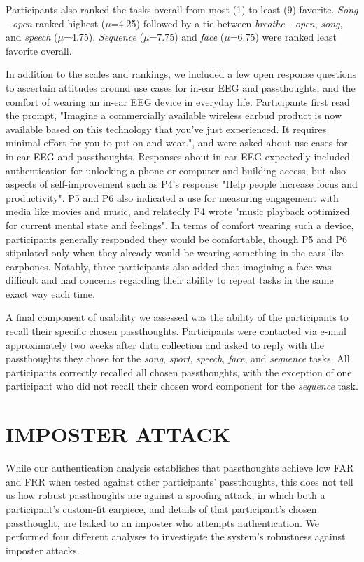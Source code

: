 \documentclass[a4paper,twoside]{article}
\begin{document}
Participants also ranked the tasks overall from most (1) to least (9) favorite. \textit{Song - open} ranked highest (\(\mu\)=4.25) followed by a tie between \textit{breathe - open}, \textit{song}, and \textit{speech} (\(\mu\)=4.75). \textit{Sequence} (\(\mu\)=7.75) and \textit{face} (\(\mu\)=6.75) were ranked least favorite overall.

In addition to the scales and rankings, we included a few open response questions to ascertain attitudes around use cases for in-ear EEG and passthoughts, and the comfort of wearing an in-ear EEG device in everyday life. Participants first read the prompt, "Imagine a commercially available wireless earbud product is now available based on this technology that you've just experienced. It requires minimal effort for you to put on and wear.", and were asked about use cases for in-ear EEG and passthoughts. Responses about in-ear EEG expectedly included authentication for unlocking a phone or computer and building access, but also aspects of self-improvement such as P4's response "Help people increase focus and productivity". P5 and P6 also indicated a use for measuring engagement with media like movies and music, and relatedly P4 wrote "music playback optimized for current mental state and feelings". In terms of comfort wearing such a device, participants generally responded they would be comfortable, though P5 and P6 stipulated only when they already would be wearing something in the ears like earphones. Notably, three participants also added that imagining a face was difficult and had concerns regarding their ability to repeat tasks in the same exact way each time.

A final component of usability we assessed was the ability of the participants to recall their specific chosen passthoughts. Participants were contacted via e-mail approximately two weeks after data collection and asked to reply with the passthoughts they chose for the \textit{song}, \textit{sport}, \textit{speech}, \textit{face}, and \textit{sequence} tasks. All participants correctly recalled all chosen passthoughts, with the exception of one participant who did not recall their chosen word component for the \textit{sequence} task.

\section{\uppercase{Imposter Attack}}
\label{sec:imposterattack}

\noindent While our authentication analysis establishes that passthoughts achieve low FAR and FRR when tested against other participants' passthoughts, this does not tell us how robust passthoughts are against a spoofing attack, in which both a participant's custom-fit earpiece, and details of that participant's chosen passthought, are leaked to an imposter who attempts authentication. We performed four different analyses to investigate the system's robustness against imposter attacks.
\end{document}
